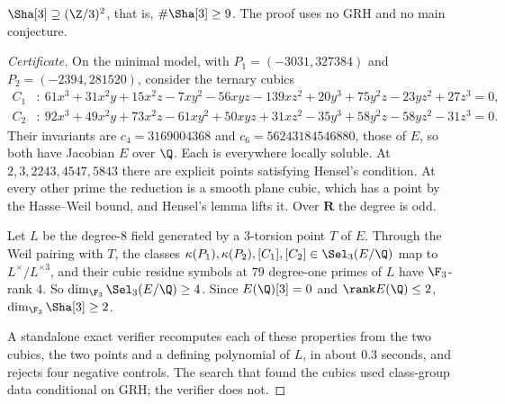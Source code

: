 \begin{theorem}\label{thm:sha3lower}
$\Sha[3]\supseteq(\Z/3)^2$, that is, $\#\Sha[3]\ge9$. The proof uses no GRH and no main conjecture.
\end{theorem}
\begin{proof}[Certificate]
On the minimal model, with $P_1=(-3031,327384)$ and $P_2=(-2394,281520)$, consider the ternary cubics
\begin{align*}
C_1&:\ 61x^3+31x^2y+15x^2z-7xy^2-56xyz-139xz^2+20y^3+75y^2z-23yz^2+27z^3=0,\\
C_2&:\ 92x^3+49x^2y+73x^2z-61xy^2+50xyz+31xz^2-35y^3+58y^2z-58yz^2-31z^3=0.
\end{align*}
Their invariants are $c_4=3169004368$ and $c_6=56243184546880$, those of $E$, so both have Jacobian $E$ over $\Q$. Each is everywhere locally soluble. At $2,3,2243,4547,5843$ there are explicit points satisfying Hensel's condition. At every other prime the reduction is a smooth plane cubic, which has a point by the Hasse--Weil bound, and Hensel's lemma lifts it. Over $\mathbf{R}$ the degree is odd.

Let $L$ be the degree-$8$ field generated by a $3$-torsion point $T$ of $E$. Through the Weil pairing with $T$, the classes $\kappa(P_1),\kappa(P_2),[C_1],[C_2]\in\Sel_3(E/\Q)$ map to $L^\times/L^{\times3}$, and their cubic residue symbols at $79$ degree-one primes of $L$ have $\F_3$-rank $4$. So $\dim_{\F_3}\Sel_3(E/\Q)\ge4$. Since $E(\Q)[3]=0$ and $\rank E(\Q)\le2$, $\dim_{\F_3}\Sha[3]\ge2$.

A standalone exact verifier recomputes each of these properties from the two cubics, the two points and a defining polynomial of $L$, in about $0.3$ seconds, and rejects four negative controls. The search that found the cubics used class-group data conditional on GRH; the verifier does not.
\end{proof}

